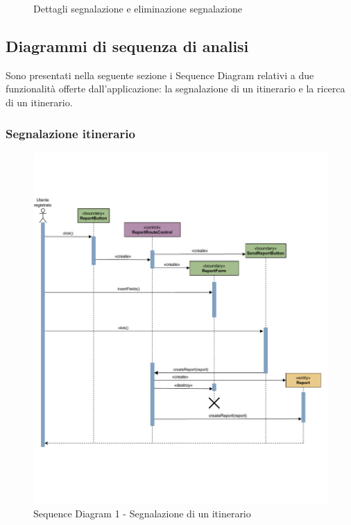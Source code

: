 \documentclass{natourDoc}
\begin{document}
\begin{figure}[!htpb]
	\centering
	
	\caption{Dettagli segnalazione e eliminazione segnalazione}
\end{figure}
\FloatBarrier


\newpage
\subsection{Diagrammi di sequenza di analisi}
Sono presentati nella seguente sezione i Sequence Diagram relativi a due funzionalità offerte dall'applicazione:
la segnalazione di un itinerario e la ricerca di un itinerario.
\subsubsection{Segnalazione itinerario}
\begin{figure}[!htbp]
	\centering
	\includegraphics[width=\textwidth, page=1]{./diagrams/sequenceDomain-segnalazioneItinerario.pdf}
	\caption{Sequence Diagram 1 - Segnalazione di un itinerario}
\end{figure}
\FloatBarrier
\end{document}
